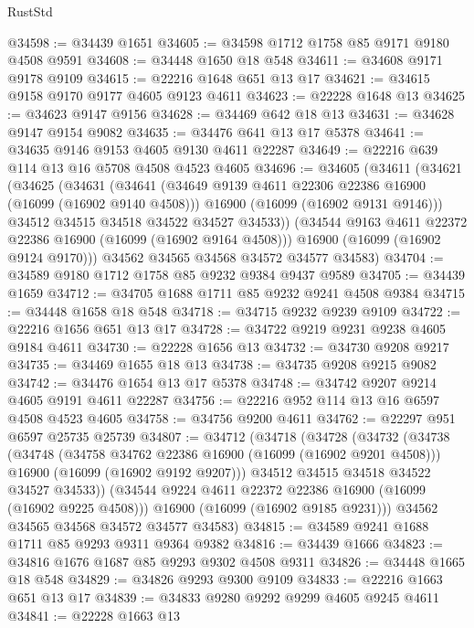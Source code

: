 \begin{lexlean}{RustStd}
\begin{coremodule}
@34598 := @34439 @1651
@34605 := @34598 @1712 @1758 @85 @9171 @9180 @4508 @9591
@34608 := @34448 @1650 @18 @548
@34611 := @34608 @9171 @9178 @9109
@34615 := @22216 @1648 @651 @13 @17
@34621 := @34615 @9158 @9170 @9177 @4605 @9123 @4611
@34623 := @22228 @1648 @13
@34625 := @34623 @9147 @9156
@34628 := @34469 @642 @18 @13
@34631 := @34628 @9147 @9154 @9082
@34635 := @34476 @641 @13 @17 @5378
@34641 := @34635 @9146 @9153 @4605 @9130 @4611 @22287
@34649 := @22216 @639 @114 @13 @16 @5708 @4508 @4523 @4605
@34696 := @34605
    (@34611
      (@34621
        (@34625
          (@34631
            (@34641
              (@34649 @9139 @4611 @22306 @22386 @16900 (@16099 (@16902 @9140 @4508)))
              @16900
              (@16099 (@16902 @9131 @9146)))
            @34512
            @34515
            @34518
            @34522
            @34527
            @34533))
        (@34544 @9163 @4611 @22372 @22386 @16900 (@16099 (@16902 @9164 @4508)))
        @16900
        (@16099 (@16902 @9124 @9170)))
      @34562
      @34565
      @34568
      @34572
      @34577
      @34583)
@34704 := @34589 @9180 @1712 @1758 @85 @9232 @9384 @9437 @9589
@34705 := @34439 @1659
@34712 := @34705 @1688 @1711 @85 @9232 @9241 @4508 @9384
@34715 := @34448 @1658 @18 @548
@34718 := @34715 @9232 @9239 @9109
@34722 := @22216 @1656 @651 @13 @17
@34728 := @34722 @9219 @9231 @9238 @4605 @9184 @4611
@34730 := @22228 @1656 @13
@34732 := @34730 @9208 @9217
@34735 := @34469 @1655 @18 @13
@34738 := @34735 @9208 @9215 @9082
@34742 := @34476 @1654 @13 @17 @5378
@34748 := @34742 @9207 @9214 @4605 @9191 @4611 @22287
@34756 := @22216 @952 @114 @13 @16 @6597 @4508 @4523 @4605
@34758 := @34756 @9200 @4611
@34762 := @22297 @951 @6597 @25735 @25739
@34807 := @34712
    (@34718
      (@34728
        (@34732
          (@34738
            (@34748
              (@34758 @34762 @22386 @16900 (@16099 (@16902 @9201 @4508)))
              @16900
              (@16099 (@16902 @9192 @9207)))
            @34512
            @34515
            @34518
            @34522
            @34527
            @34533))
        (@34544 @9224 @4611 @22372 @22386 @16900 (@16099 (@16902 @9225 @4508)))
        @16900
        (@16099 (@16902 @9185 @9231)))
      @34562
      @34565
      @34568
      @34572
      @34577
      @34583)
@34815 := @34589 @9241 @1688 @1711 @85 @9293 @9311 @9364 @9382
@34816 := @34439 @1666
@34823 := @34816 @1676 @1687 @85 @9293 @9302 @4508 @9311
@34826 := @34448 @1665 @18 @548
@34829 := @34826 @9293 @9300 @9109
@34833 := @22216 @1663 @651 @13 @17
@34839 := @34833 @9280 @9292 @9299 @4605 @9245 @4611
@34841 := @22228 @1663 @13

\end{coremodule}
\end{lexlean}
